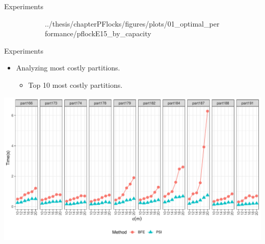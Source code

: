 \begin{frame}{Experiments}
\begin{figure}
\begin{subfigure}[t]{0.32\textwidth}
{                {../thesis/chapterPFlocks/figures/plots/01_optimal_performance/pflockE15_by_capacity}}
            \end{subfigure}
            \begin{subfigure}[t]{0.32\textwidth}
            \end{subfigure}
        \end{figure}
    \end{frame}

    \begin{frame}{Experiments}
        \begin{itemize} \item Analyzing most costly partitions.
            \begin{itemize}
                \item Top 10 most costly partitions.
            \end{itemize}
        \end{itemize} \vspace{0.25cm}

        \centering
        \includegraphics[width=\textwidth]
                {../thesis/chapterPFlocks/figures/plots/03_top_time_partitions/top_time_partitions}

    \end{frame}

